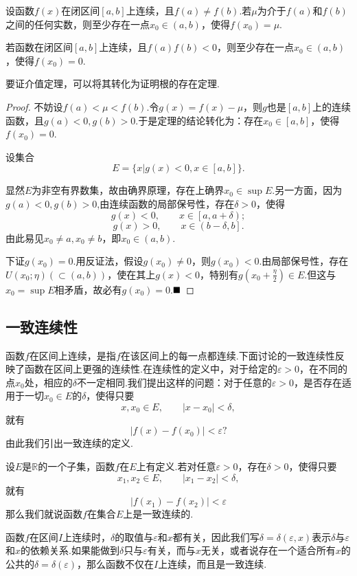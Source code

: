 \begin{theorem}[介值定理]
	设函数$f(x)$在闭区间$\left[a,b\right]$上连续，且$f(a)\neq f(b)$.若$\mu$为介于$f(a)$和$f(b)$之间的任何实数，则至少存在一点$x_0\in(a,b)$，使得$f(x_0)=\mu.$
\end{theorem}
\begin{corollary}[根的存在定理]
	若函数在闭区间$\left[a,b\right]$上连续，且$f(a)f(b)<0$，则至少存在一点$x_0\in(a,b)$，使得$f(x_0)=0$.
\end{corollary}
要证介值定理，可以将其转化为证明根的存在定理.
\begin{proof}
	不妨设$f(a)<\mu<f(b)$.令$g(x)=f(x)-\mu$，则$g$也是$\left[a,b\right]$上的连续函数，且$g(a)<0,g(b)>0.$于是定理的结论转化为：存在$x_0\in\left[a,b\right]$，使得$f(x_0)=0$.
	
	设集合
	$$E=\{x|g(x)<0,x\in\left[a,b\right]\}.$$
	
	显然$E$为非空有界数集，故由确界原理，存在上确界$x_0\in\sup E.$另一方面，因为$g(a)<0,g(b)>0$,由连续函数的局部保号性，存在$\delta>0$，使得
	$$g(x)<0,\qquad x\in\left[a,a+\delta\right);$$
	$$g(x)>0,\qquad x\in\left(b-\delta,b\right].$$
	由此易见$x_0\neq a,x_0\neq b$，即$x_0\in(a,b)$.
	
	下证$g(x_0)=0$.用反证法，假设$g(x_0)\neq 0$，则$g(x_0)<0$.由局部保号性，存在$U(x_0;\eta)(\subset(a,b))$，使在其上$g(x)<0$，特别有$g(x_0+\frac{\eta}{2})\in E.$但这与$x_0=\sup E$相矛盾，故必有$g(x_0)=0$.$\hfill\blacksquare$
\end{proof}
\subsection{一致连续性}
函数$f$在区间上连续，是指$f$在该区间上的每一点都连续.下面讨论的一致连续性反映了函数在区间上更强的连续性.在连续性的定义中，对于给定的$\varepsilon>0$，在不同的点$x_0$处，相应的$\delta$不一定相同.我们提出这样的问题：对于任意的$\varepsilon>0$，是否存在适用于一切$x_0\in E$的$\delta$，使得只要$$x,x_0\in E,\qquad |x-x_0|<\delta,$$
就有$$|f(x)-f(x_0)|<\varepsilon?$$
由此我们引出一致连续的定义.
\begin{definition}[一致连续]
	设$E$是$\mathbb{R}$的一个子集，函数$f$在$E$上有定义.若对任意$\varepsilon>0$，存在$\delta>0$，使得只要
	$$x_1,x_2\in E,\qquad |x_1-x_2|<\delta,$$
	就有$$|f(x_1)-f(x_2)|<\varepsilon$$
	那么我们就说函数$f$在集合$E$上是{\heiti 一致连续}的.
\end{definition}
函数$f$在区间$I$上连续时，$\delta$的取值与$\varepsilon$和$x$都有关，因此我们写$\delta=\delta(\varepsilon,x)$表示$\delta$与$\varepsilon$和$x$的依赖关系.如果能做到$\delta$只与$\varepsilon$有关，而与$x$无关，或者说存在一个适合所有$x$的公共的$\delta=\delta(\varepsilon)$，那么函数不仅在$I$上连续，而且是一致连续.

